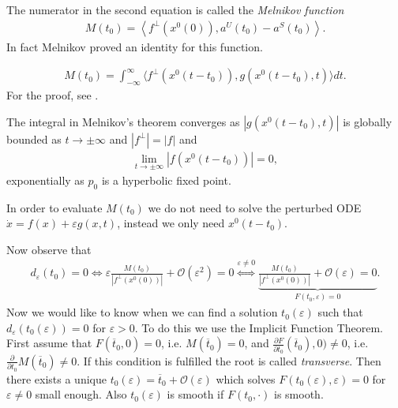 The numerator in the second equation is called the \emph{Melnikov function}
\begin{align}
	M(t_0)=\left\langle f^{\perp}(x^{0}(0)), a^{U}(t_0) - a^{S}(t_0) \right\rangle	.
\end{align}
In fact Melnikov proved an identity for this function.
\begin{theorem}[Melnikov]
	\begin{align}
		M(t_0) = \int_{-\infty }^{\infty }  \langle f^{\perp}(x^{0}(t-t_0)), g(x^{0}(t-t_0),t)\rangle dt.
	\end{align}
	For the proof, see \cite{GuckenheimerHolmes}.	
\end{theorem}
\begin{remark}[]
	The integral in Melnikov's theorem converges as $|g(x^{0}(t-t_0),t)|$ is globally bounded as $t \to \pm \infty $ and $|f^{\perp}| = |f|$ and
	\begin{align}
		\lim_{t\to \pm \infty }\left| f(x^{0}(t-t_0)) \right| =0,
	\end{align}
	exponentially as $p_0$ is a hyperbolic fixed point.	
\end{remark}

\begin{remark}[]
	In order to evaluate $M(t_0)$ we do not need to solve the perturbed ODE $\dot{x} =f(x) + \varepsilon g(x,t)$, instead we only need $x^{0}(t-t_0)$.
\end{remark}

Now observe that
\begin{align}
	d_{\varepsilon} (t_0) = 0 \iff \varepsilon \frac{M(t_0)}{\left| f^{\perp}(x^{0}(0))\right|} + \mathcal{O}(\varepsilon^2) = 0 \overset{\varepsilon \neq 0}{\iff} \underbrace{\frac{M(t_0)}{\left| f^{\perp}(x^{0}(0)) \right|} + \mathcal{O}(\varepsilon)=0}_{F(t_0, \varepsilon) = 0}.
\end{align}
Now we would like to know when we can find a solution $t_0(\varepsilon)$ such that $d_{\varepsilon}(t_0(\varepsilon))=0$ for $\varepsilon > 0$. To do this we use the Implicit Function Theorem. First assume that $F(\overline{t}_{0}, 0) = 0$, i.e. $M(\overline{t}_0) = 0$, and $\frac{\partial F}{\partial t_0}(\overline{t}_0), 0) \neq 0$, i.e. $\frac{\partial }{\partial t_0}M(\overline{t}_0) \neq 0$. If this condition is fulfilled the root is called \emph{transverse}.  Then there exists a unique $t_0(\varepsilon) = \overline{t}_{0} + \mathcal{O}(\varepsilon)$ which solves $F(t_0(\varepsilon), \varepsilon)=0$ for $\varepsilon \neq 0$ small enough. Also $t_0(\varepsilon)$ is smooth if $F(t_0,\cdot)$ is smooth.

